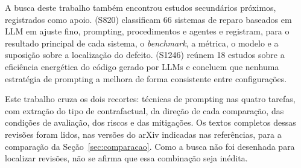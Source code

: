 A busca deste trabalho também encontrou estudos secundários próximos, registrados como apoio.
 (S820) classificam 66 sistemas de reparo baseados em LLM em ajuste fino,
prompting, procedimentos e agentes e registram, para o resultado principal de cada sistema, o \textit{benchmark}, a
métrica, o modelo e a suposição sobre a localização do defeito.
 (S1246) reúnem 18 estudos sobre a eficiência energética do código
gerado por LLMs e concluem que nenhuma estratégia de prompting a melhora de forma consistente entre configurações.

Este trabalho cruza os dois recortes: técnicas de prompting nas quatro tarefas, com extração do tipo de
contrafactual, da direção de cada comparação, das condições de avaliação, dos riscos e das mitigações. Os textos
completos dessas revisões foram lidos, nas versões do arXiv indicadas nas referências, para a comparação da Seção~\ref{sec:comparacao}. Como a
busca não foi desenhada para localizar revisões, não se afirma que essa combinação seja inédita.
